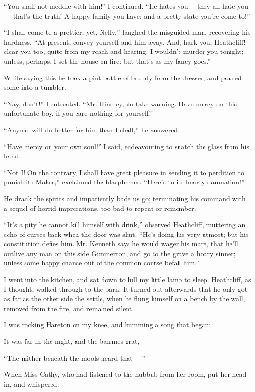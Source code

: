 \par “You shall not meddle with him!” I continued. “He hates you —they all hate you — that's the truth! A happy family you have: and a pretty state you're come to!”
\par “I shall come to a prettier, yet, Nelly,” laughed the misguided man, recovering his hardness. “At present, convey yourself and him away. And, hark you, Heathcliff! clear you too, quite from my reach and hearing. I wouldn't murder you tonight; unless, perhaps, I set the house on fire: but that's as my fancy goes.”
\par While saying this he took a pint bottle of brandy from the dresser, and poured some into a tumbler.
\par “Nay, don't!” I entreated. “Mr. Hindley, do take warning. Have mercy on this unfortunate boy, if you care nothing for yourself!”
\par “Anyone will do better for him than I shall,” he answered.
\par “Have mercy on your own soul!” I said, endeavouring to snatch the glass from his hand.
\par “Not I! On the contrary, I shall have great pleasure in sending it to perdition to punish its Maker,” exclaimed the blasphemer. “Here's to its hearty damnation!”
\par He drank the spirits and impatiently bade us go; terminating his command with a sequel of horrid imprecations, too bad to repeat or remember.
\par “It's a pity he cannot kill himself with drink,” observed Heathcliff, muttering an echo of curses back when the door was shut. “He's doing his very utmost; but his constitution defies him. Mr. Kenneth says he would wager his mare, that he'll outlive any man on this side Gimmerton, and go to the grave a hoary sinner; unless some happy chance out of the common course befall him.”
\par I went into the kitchen, and sat down to lull my little lamb to sleep. Heathcliff, as I thought, walked through to the barn. It turned out afterwards that he only got as far as the other side the settle, when he flung himself on a bench by the wall, removed from the fire, and remained silent.
\par I was rocking Hareton on my knee, and humming a song that began:
\par It was far in the night, and the bairnies grat,
\par “The mither beneath the mools heard that —”
\par When Miss Cathy, who had listened to the hubbub from her room, put her head in, and whispered:
